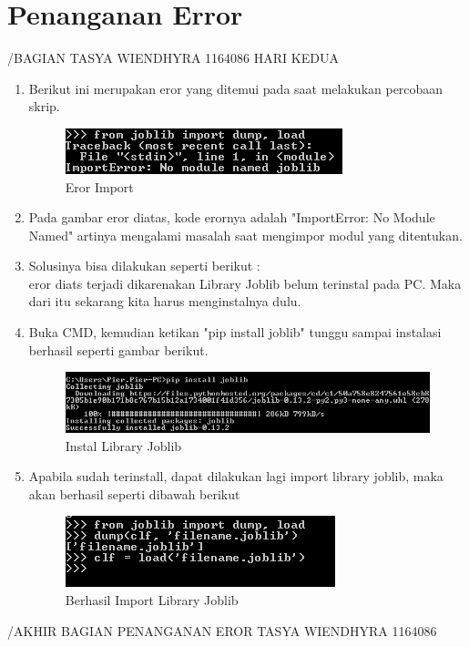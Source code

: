 \section{Penanganan Error} /BAGIAN TASYA WIENDHYRA 1164086
HARI KEDUA
\begin{enumerate}
	\item
	Berikut ini merupakan eror yang ditemui pada saat melakukan percobaan skrip.
\begin{figure}
	\begin{center}
   	 \includegraphics[scale=1]{figures/eror2.png}
   	 \caption{Eror Import}
	\end{center}
\end{figure}
	\item
Pada gambar eror diatas, kode erornya adalah "ImportError: No Module Named" artinya mengalami masalah saat mengimpor modul yang ditentukan.
	\item
Solusinya bisa dilakukan seperti berikut :\\
eror diats terjadi dikarenakan Library Joblib belum terinstal pada PC. Maka dari itu sekarang kita harus menginstalnya dulu.
	\item
Buka CMD, kemudian ketikan "pip install joblib" tunggu sampai instalasi berhasil seperti gambar berikut.
\begin{figure}
	\begin{center}
   	 \includegraphics[scale=1]{figures/solusi2.png}
   	 \caption{Instal Library Joblib}
	\end{center}
\end{figure}
	\item
Apabila sudah terinstall, dapat dilakukan lagi import library joblib, maka akan berhasil seperti dibawah berikut
\begin{figure}
	\begin{center}
   	 \includegraphics[scale=1]{figures/solusi2_1.png}
   	 \caption{Berhasil Import Library Joblib}
	\end{center}
\end{figure}
\end{enumerate}
/AKHIR BAGIAN PENANGANAN EROR TASYA WIENDHYRA 1164086

